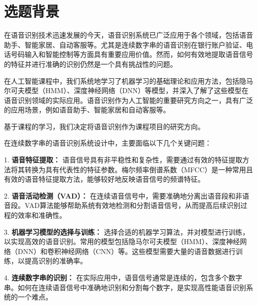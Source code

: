 \documentclass[12pt,hyperref,a4paper,UTF8]{ctexart}
\begin{document}
\cover

%
%

\thispagestyle{empty} %

\newpage
\tableofcontents

\newpage

\section{选题背景}

在语音识别技术迅速发展的今天，语音识别系统已广泛应用于各个领域，包括语音助手、智能家居、自动客服等。尤其是连续数字串的语音识别在银行账户验证、电话号码输入和智能控制等方面具有重要应用价值。然而，如何有效地提取语音信号的特征并进行准确的识别仍然是一个具有挑战性的问题。

在人工智能课程中，我们系统地学习了机器学习的基础理论和应用方法，包括隐马尔可夫模型（HMM）、深度神经网络（DNN）等模型，并深入了解了这些模型在语音识别领域的实际应用。语音识别作为人工智能的重要研究方向之一，具有广泛的应用场景，例如语音助手、智能家居和自动客服等。

基于课程的学习，我们决定将语音识别作为课程项目的研究方向。

在连续数字串的语音识别系统设计中，主要面临以下几个关键问题：

1. \textbf{语音特征提取：} 语音信号具有非平稳性和复杂性，需要通过有效的特征提取方法将其转换为具有代表性的特征参数。梅尔频率倒谱系数（MFCC）是一种常用且有效的语音特征提取方法，能够较好地反映语音信号的频谱特征。

2. \textbf{语音活动检测（VAD）：} 在连续语音信号中，需要准确地分离出语音段和非语音段。VAD算法能够帮助系统有效地检测和分割语音信号，从而提高后续识别过程的效率和准确性。

3. \textbf{机器学习模型的选择与训练：} 选择合适的机器学习算法，并对模型进行训练，以实现高效的语音识别。常用的模型包括隐马尔可夫模型（HMM）、深度神经网络（DNN）和卷积神经网络（CNN）等。这些模型需要大量的语音数据进行训练，以提高识别的准确率。

4. \textbf{连续数字串的识别：} 在实际应用中，语音信号通常是连续的，包含多个数字串。如何在连续语音信号中准确地识别和分割每个数字，是实现高性能语音识别系统的一个难点。
\end{document}
